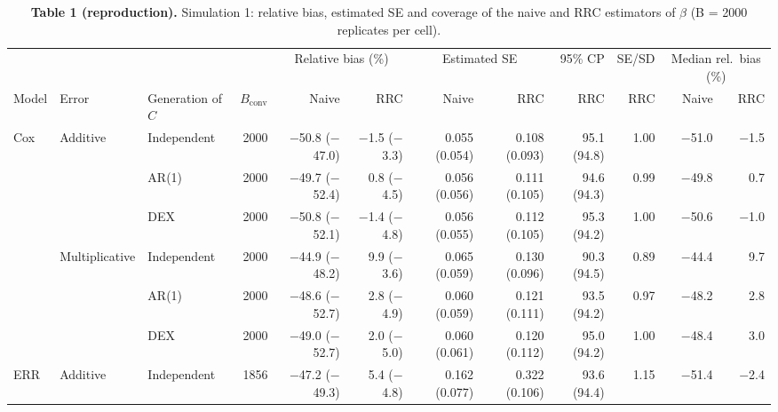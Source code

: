 \documentclass[10pt]{article}
\begin{document}
\begin{table}[ht]\centering\small
\begin{threeparttable}
\caption*{\textbf{Table 1 (reproduction).} Simulation 1: relative bias, estimated SE and coverage of the naive and RRC estimators of $\beta$ (B = 2000 replicates per cell).}
\begin{tabular}{lll r rr rr r r rr}
\toprule
 & & & & \multicolumn{2}{c}{Relative bias (\%)} & \multicolumn{2}{c}{Estimated SE} & 95\% CP & SE/SD & \multicolumn{2}{c}{Median rel.\ bias (\%)} \\
\cmidrule(lr){5-6}\cmidrule(lr){7-8}\cmidrule(lr){9-9}\cmidrule(lr){10-10}\cmidrule(l){11-12}
Model & Error & Generation of $C$ & $B_{\mathrm{conv}}$ & Naive & RRC & Naive & RRC & RRC & RRC & Naive & RRC \\
\midrule
\multirow{6}{*}{Cox} & \multirow{3}{*}{Additive} & Independent & 2000 & $-$50.8 {\color{gray}($-$47.0)} & $-$1.5 {\color{gray}($-$3.3)} & 0.055 {\color{gray}(0.054)} & 0.108 {\color{gray}(0.093)} & 95.1 {\color{gray}(94.8)} & 1.00 & $-$51.0 & $-$1.5 \\
 &  & AR(1) & 2000 & $-$49.7 {\color{gray}($-$52.4)} & 0.8 {\color{gray}($-$4.5)} & 0.056 {\color{gray}(0.056)} & 0.111 {\color{gray}(0.105)} & 94.6 {\color{gray}(94.3)} & 0.99 & $-$49.8 & 0.7 \\
 &  & DEX & 2000 & $-$50.8 {\color{gray}($-$52.1)} & $-$1.4 {\color{gray}($-$4.8)} & 0.056 {\color{gray}(0.055)} & 0.112 {\color{gray}(0.105)} & 95.3 {\color{gray}(94.2)} & 1.00 & $-$50.6 & $-$1.0 \\
\cmidrule(l){2-12}
 & \multirow{3}{*}{Multiplicative} & Independent & 2000 & $-$44.9 {\color{gray}($-$48.2)} & 9.9 {\color{gray}($-$3.6)} & 0.065 {\color{gray}(0.059)} & 0.130 {\color{gray}(0.096)} & 90.3 {\color{gray}(94.5)} & 0.89 & $-$44.4 & 9.7 \\
 &  & AR(1) & 2000 & $-$48.6 {\color{gray}($-$52.7)} & 2.8 {\color{gray}($-$4.9)} & 0.060 {\color{gray}(0.059)} & 0.121 {\color{gray}(0.111)} & 93.5 {\color{gray}(94.2)} & 0.97 & $-$48.2 & 2.8 \\
 &  & DEX & 2000 & $-$49.0 {\color{gray}($-$52.7)} & 2.0 {\color{gray}($-$5.0)} & 0.060 {\color{gray}(0.061)} & 0.120 {\color{gray}(0.112)} & 95.0 {\color{gray}(94.2)} & 1.00 & $-$48.4 & 3.0 \\
\midrule
\multirow{6}{*}{ERR} & \multirow{3}{*}{Additive} & Independent & 1856 & $-$47.2 {\color{gray}($-$49.3)} & 5.4 {\color{gray}($-$4.8)} & 0.162 {\color{gray}(0.077)} & 0.322 {\color{gray}(0.106)} & 93.6 {\color{gray}(94.4)} & 1.15 & $-$51.4 & $-$2.4 \\

\end{tabular}
\end{threeparttable}
\end{table}
\end{document}

